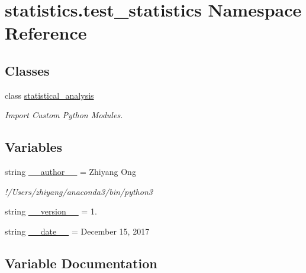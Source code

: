 \hypertarget{namespacestatistics_1_1test__statistics}{}\section{statistics.\+test\+\_\+statistics Namespace Reference}
\label{namespacestatistics_1_1test__statistics}
\subsection*{Classes}
\begin{DoxyCompactItemize}
\item 
class \hyperlink{classstatistics_1_1test__statistics_1_1statistical__analysis}{statistical\+\_\+analysis}
\begin{DoxyCompactList}\small\item\em Import Custom Python Modules. \end{DoxyCompactList}\end{DoxyCompactItemize}
\subsection*{Variables}
\begin{DoxyCompactItemize}
\item 
string \hyperlink{namespacestatistics_1_1test__statistics_a188ace18635f13c413bf14347b4eb7f0}{\+\_\+\+\_\+author\+\_\+\+\_\+} = \textquotesingle{}Zhiyang Ong\textquotesingle{}
\begin{DoxyCompactList}\small\item\em !/\+Users/zhiyang/anaconda3/bin/python3 \end{DoxyCompactList}\item 
string \hyperlink{namespacestatistics_1_1test__statistics_ad5c236202b813efcbc877e38a20d7f07}{\+\_\+\+\_\+version\+\_\+\+\_\+} = \textquotesingle{}1.\textquotesingle{}
\item 
string \hyperlink{namespacestatistics_1_1test__statistics_a271285b175d250f7888c9b41fa124abd}{\+\_\+\+\_\+date\+\_\+\+\_\+} = \textquotesingle{}December 15, 2017\textquotesingle{}
\end{DoxyCompactItemize}


\subsection{Variable Documentation}
\hypertarget{namespacestatistics_1_1test__statistics_a188ace18635f13c413bf14347b4eb7f0}{}
